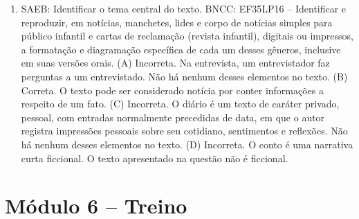 \begin{enumerate}
\item
SAEB: Identificar o tema central do texto.
BNCC: EF35LP16 -- Identificar e reproduzir, em notícias, manchetes, lides
e corpo de notícias simples para público infantil e cartas de reclamação
(revista infantil), digitais ou impressos, a formatação e diagramação
específica de cada um desses gêneros, inclusive em suas versões orais.
(A) Incorreta. Na entrevista, um entrevistador faz perguntas a um 
entrevistado. Não há nenhum desses elementos no texto. 
(B) Correta. O texto pode ser considerado notícia por conter informações a 
respeito de um fato.
(C) Incorreta. O diário é um texto de caráter privado, pessoal, com entradas
normalmente precedidas de data, em que o autor registra impressões pessoais
sobre seu cotidiano, sentimentos e reflexões. Não há nenhum desses
elementos no texto. 
(D) Incorreta. O conto é uma narrativa curta ficcional. O texto apresentado 
na questão não é ficcional.
\end{enumerate}

\section*{Módulo 6 – Treino}

